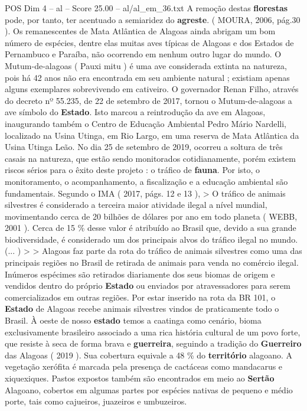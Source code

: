 \begin{textsample}{POS Dim 4 – al – Score 25.00 – al/al\_em\_36.txt}
A remoção destas \textbf{florestas} pode, por tanto, ter acentuado a semiaridez do \textbf{agreste}. ( MOURA, 2006, pág.30 ).
Os remanescentes de Mata Atlântica de Alagoas ainda abrigam um bom número de espécies, dentre elas muitas aves típicas de Alagoas e dos Estados de Pernambuco e Paraíba, não ocorrendo em nenhum outro lugar do mundo.
O Mutum-de-alagoas ( Pauxi mitu ) é uma ave considerada extinta na natureza, pois há 42 anos não era encontrada em seu ambiente natural ; existiam apenas alguns exemplares sobrevivendo em cativeiro.
O governador Renan Filho, através do decreto nº 55.235, de 22 de setembro de 2017, tornou o Mutum-de-alagoas a ave símbolo do \textbf{Estado}.
Isto marcou a reintrodução da ave em Alagoas, inaugurando também o Centro de Educação Ambiental Pedro Mário Nardelli, localizado na Usina Utinga, em Rio Largo, em uma reserva de Mata Atlântica da Usina Utinga Leão.
No dia 25 de setembro de 2019, ocorreu a soltura de três casais na natureza, que estão sendo monitorados cotidianamente, porém existem riscos sérios para o êxito deste projeto : o tráfico de \textbf{fauna}.
Por isto, o monitoramento, o acompanhamento, a fiscalização e a educação ambiental são fundamentais.
Segundo o IMA ( 2017, págs. 12 e 13 ), > O tráfico de animais silvestres é considerado a terceira maior atividade ilegal a nível mundial, movimentando cerca de 20 bilhões de dólares por ano em todo planeta ( WEBB, 2001 ).
Cerca de 15 \% desse valor é atribuído ao Brasil que, devido a sua grande biodiversidade, é considerado um dos principais alvos do tráfico ilegal no mundo.(... ) > > Alagoas faz parte da rota do tráfico de animais silvestres como uma das principais regiões no Brasil de retirada de animais para venda no comércio ilegal.
Inúmeros espécimes são retirados diariamente dos seus biomas de origem e vendidos dentro do próprio \textbf{Estado} ou enviados por atravessadores para serem comercializados em outras regiões.
Por estar inserido na rota da BR 101, o \textbf{Estado} de Alagoas recebe animais silvestres vindos de praticamente todo o Brasil.
À oeste de nosso \textbf{estado} temos a caatinga como cenário, bioma exclusivamente brasileiro associado a uma rica história cultural de um povo forte, que resiste à seca de forma brava e \textbf{guerreira}, seguindo a tradição do \textbf{Guerreiro} das Alagoas ( 2019 ).
Sua cobertura equivale a 48 \% do \textbf{território} alagoano.
A vegetação xerófita é marcada pela presença de cactáceas como mandacarus e xiquexiques.
Pastos expostos também são encontrados em meio ao \textbf{Sertão} Alagoano, cobertos em algumas partes por espécies nativas de pequeno e médio porte, tais como cajueiros, juazeiros e umbuzeiros.

\end{textsample}
